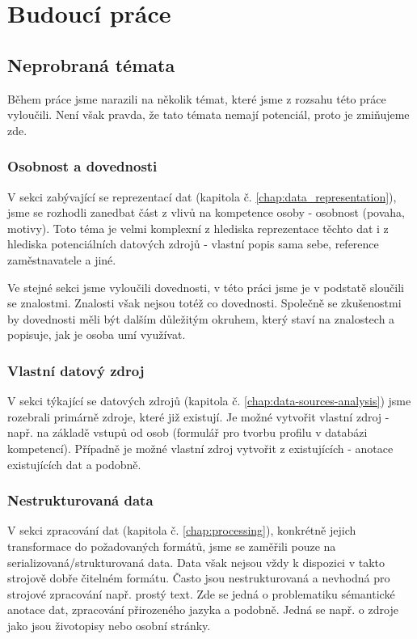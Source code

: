 \chapter{Budoucí práce} \label{future}
\section{Neprobraná témata}
Během práce jsme narazili na několik témat, které jsme z rozsahu této práce vyloučili. Není však pravda, že tato témata nemají potenciál, proto je zmiňujeme zde.\par
\subsection{Osobnost a dovednosti}
V sekci zabývající se reprezentací dat (kapitola č. \ref{chap:data_representation}), jsme se rozhodli zanedbat část z vlivů na kompetence osoby - osobnost (povaha, motivy). Toto téma je velmi komplexní z hlediska reprezentace těchto dat i z hlediska potenciálních datových zdrojů - vlastní popis sama sebe, reference zaměstnavatele a jiné.\par
Ve stejné sekci jsme vyloučili dovednosti, v této práci jsme je v podstatě sloučili se znalostmi. Znalosti však nejsou totéž co dovednosti. Společně se zkušenostmi by dovednosti měli být dalším důležitým okruhem, který staví na znalostech a popisuje, jak je osoba umí využívat.
\subsection{Vlastní datový zdroj}
V sekci týkající se datových zdrojů (kapitola č. \ref{chap:data-sources-analysis}) jsme rozebrali primárně zdroje, které již existují. Je možné vytvořit vlastní zdroj - např. na základě vstupů od osob (formulář pro tvorbu profilu v databázi kompetencí). Případně je možné vlastní zdroj vytvořit z existujících - anotace existujících dat a podobně.
\subsection{Nestrukturovaná data}
V sekci zpracování dat (kapitola č. \ref{chap:processing}), konkrétně jejich transformace do požadovaných formátů, jsme se zaměřili pouze na serializovaná/strukturovaná data. Data však nejsou vždy k dispozici v takto strojově dobře čitelném formátu. Často jsou nestrukturovaná a nevhodná pro strojové zpracování např. prostý text. Zde se jedná o problematiku sémantické anotace dat, zpracování přirozeného jazyka a podobně.
Jedná se např. o zdroje jako jsou životopisy nebo osobní stránky.
